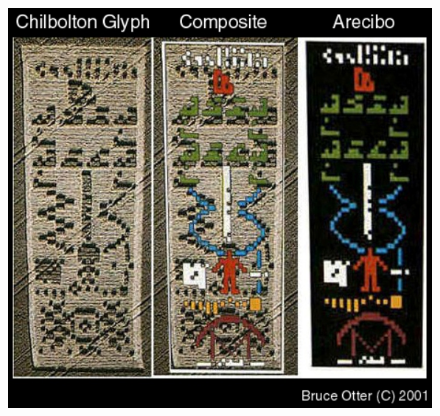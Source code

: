 \documentclass{report}
\begin{document}
\begin{figure}
  \includegraphics[width=\textwidth]{photograph/chibolton-arceibo-comparison.jpg}\label{chi:comparison}
\end{figure}
\end{document}
